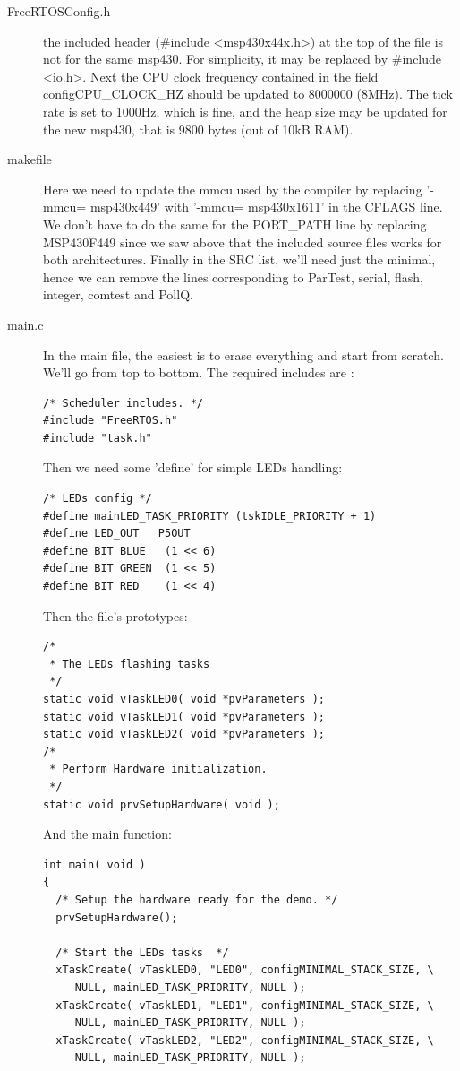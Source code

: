 \documentclass[11pt]{report}
\begin{document}
\begin{description}
  \item[FreeRTOSConfig.h] the included header (\#include <msp430x44x.h>) at the top of the file is not for the same msp430. For simplicity, it may be replaced by \#include <io.h>. Next the CPU clock frequency contained in the field configCPU\_CLOCK\_HZ should be updated to 8000000 (8MHz). The tick rate is set to 1000Hz, which is fine, and the heap size may be updated for the new msp430, that is 9800 bytes (out of 10kB RAM).

  \item[makefile] Here we need to update the mmcu used by the compiler by replacing '-mmcu= msp430x449' with '-mmcu= msp430x1611' in the CFLAGS line. We don't have to do the same for the PORT\_PATH line by replacing MSP430F449 since we saw above that the included source files works for both architectures. Finally in the SRC list, we'll need just the minimal, hence we can remove the lines corresponding to ParTest, serial, flash, integer, comtest and PollQ.

  \item[main.c] In the main file, the easiest is to erase everything and start from scratch. We'll go from top to bottom. The required includes are :
\begin{verbatim}
/* Scheduler includes. */
#include "FreeRTOS.h"
#include "task.h"
\end{verbatim}

Then we need some 'define' for simple LEDs handling:
\begin{verbatim}
/* LEDs config */
#define mainLED_TASK_PRIORITY (tskIDLE_PRIORITY + 1)
#define LED_OUT   P5OUT
#define BIT_BLUE   (1 << 6)
#define BIT_GREEN  (1 << 5)
#define BIT_RED    (1 << 4)
\end{verbatim}

Then the file's prototypes:
\begin{verbatim}
/*
 * The LEDs flashing tasks
 */
static void vTaskLED0( void *pvParameters );
static void vTaskLED1( void *pvParameters );
static void vTaskLED2( void *pvParameters );
/*
 * Perform Hardware initialization.
 */
static void prvSetupHardware( void );

\end{verbatim}
And the main function:
\begin{verbatim}
int main( void )
{
  /* Setup the hardware ready for the demo. */
  prvSetupHardware();

  /* Start the LEDs tasks  */
  xTaskCreate( vTaskLED0, "LED0", configMINIMAL_STACK_SIZE, \
     NULL, mainLED_TASK_PRIORITY, NULL );
  xTaskCreate( vTaskLED1, "LED1", configMINIMAL_STACK_SIZE, \
     NULL, mainLED_TASK_PRIORITY, NULL );
  xTaskCreate( vTaskLED2, "LED2", configMINIMAL_STACK_SIZE, \
     NULL, mainLED_TASK_PRIORITY, NULL );


\end{verbatim}
\end{description}
\end{document}
